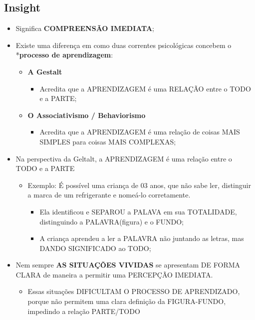 \documentclass[
]{book}
\providecommand{\tightlist}{%
  \setlength{\itemsep}{0pt}\setlength{\parskip}{0pt}}
\begin{document}
\hypertarget{insight}{%
\subsection{Insight}\label{insight}}

\begin{itemize}
\tightlist
\item
  Significa \textbf{COMPREENSÃO IMEDIATA};
\item
  Existe uma diferença em como duas correntes psicológicas concebem o *\textbf{processo de aprendizagem}:

  \begin{itemize}
  \tightlist
  \item
    \textbf{A Gestalt}

    \begin{itemize}
    \tightlist
    \item
      Acredita que a APRENDIZAGEM é uma RELAÇÃO entre o TODO e a PARTE;
    \end{itemize}
  \item
    \textbf{O Associativismo / Behaviorismo}

    \begin{itemize}
    \tightlist
    \item
      Acredita que a APRENDIZAGEM é uma relação de coisas MAIS SIMPLES para coisas MAIS COMPLEXAS;
    \end{itemize}
  \end{itemize}
\item
  Na perspectiva da Geltalt, a APRENDIZAGEM é uma relação entre o TODO e a PARTE

  \begin{itemize}
  \tightlist
  \item
    Exemplo: É possível uma criança de 03 anos, que não sabe ler, distinguir a marca de um refrigerante e nomeá-lo corretamente.

    \begin{itemize}
    \tightlist
    \item
      Ela identificou e SEPAROU a PALAVA em sua TOTALIDADE, distinguindo a PALAVRA(figura) e o FUNDO;
    \item
      A criança aprendeu a ler a PALAVRA não juntando as letras, mas DANDO SIGNIFICADO ao TODO;
    \end{itemize}
  \end{itemize}
\item
  Nem sempre \textbf{AS SITUAÇÕES VIVIDAS} se apresentam DE FORMA CLARA de maneira a permitir uma PERCEPÇÃO IMEDIATA.

  \begin{itemize}
  \tightlist
  \item
    Essas situações DIFICULTAM O PROCESSO DE APRENDIZADO, porque não permitem uma clara definição da FIGURA-FUNDO, impedindo a relação PARTE/TODO
  \end{itemize}
\end{itemize}
\end{document}
